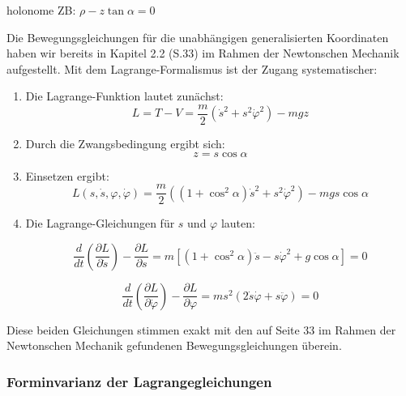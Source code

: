 \documentclass[10pt, letterpaper]{article}
\begin{document}
holonome ZB: $\rho-z\tan\alpha=0$

Die Bewegungsgleichungen für die unabhängigen generalisierten Koordinaten haben wir bereits in Kapitel 2.2 (S.33) im Rahmen der Newtonschen Mechanik aufgestellt. Mit dem Lagrange-Formalismus ist der Zugang systematischer:
\begin{enumerate}
    \item Die Lagrange-Funktion lautet zunächst:
    \[
    L = T - V = \frac{m}{2} \left( \dot{s}^2 + s^2 \dot{\varphi}^2 \right) - mgz
    \]

    \item Durch die Zwangsbedingung ergibt sich:
    \[
    z = s \cos\alpha
    \]

    \item Einsetzen ergibt:
    \[
    L(s, \dot{s}, \varphi, \dot{\varphi}) 
    = \frac{m}{2} \left( (1 + \cos^2\alpha)\dot{s}^2 + s^2 \dot{\varphi}^2 \right) - mgs\cos\alpha
    \]

    \item Die Lagrange-Gleichungen für \( s \) und \( \varphi \) lauten:

    \[
    \frac{d}{dt} \left( \frac{\partial L}{\partial \dot{s}} \right) - \frac{\partial L}{\partial s}
    = m\left[(1 + \cos^2\alpha) \ddot{s} - s \dot{\varphi}^2 + g \cos\alpha\right] = 0
    \]

    \[
    \frac{d}{dt} \left( \frac{\partial L}{\partial \dot{\varphi}} \right) - \frac{\partial L}{\partial \varphi}
    = m s^2 \left( 2 \dot{s} \dot{\varphi} + s \ddot{\varphi} \right) = 0
    \]

\end{enumerate}

Diese beiden Gleichungen stimmen exakt mit den auf Seite 33 im Rahmen der Newtonschen Mechanik gefundenen Bewegungsgleichungen überein.


\pagebreak


\subsubsection{Forminvarianz der Lagrangegleichungen}
\end{document}
